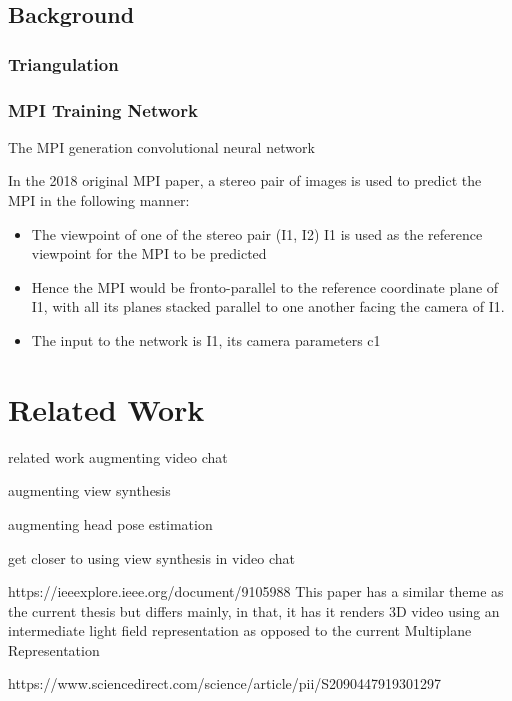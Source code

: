 \section{Background}\label{sec1:background}

\subsection{Triangulation}\label{subsec2:triangulation}

 \subsection{MPI Training Network}\label{subsec2:mpi-training}
 
The MPI generation convolutional neural network 

In the 2018 original MPI paper, a stereo pair of images is used to predict the MPI in the following manner:

\begin{itemize}
    \item The viewpoint of one of the stereo pair (I1, I2) I1 is used as the reference viewpoint for the MPI to be predicted
    \item Hence the MPI would be fronto-parallel to the reference coordinate plane of I1, with all its planes stacked parallel to one another facing the camera of I1.
    \item The input to the network is I1, its camera parameters c1
\end{itemize}

\chapter{Related Work}\label{ch2:related-work}
related work augmenting video chat 

augmenting view synthesis


augmenting head pose estimation

get closer to using view synthesis in video chat 

https://ieeexplore.ieee.org/document/9105988
This paper has a similar theme as the current thesis but differs mainly, in that, it has it renders 3D video using an intermediate light field representation as opposed to the current Multiplane Representation

https://www.sciencedirect.com/science/article/pii/S2090447919301297




